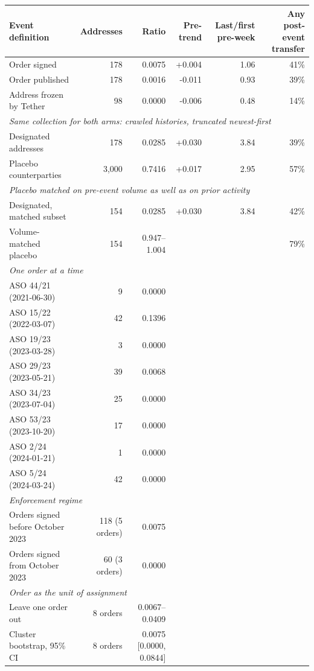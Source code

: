 \begin{tabular}{lrrrrr}
\toprule
Event definition & Addresses & Ratio & Pre-trend & Last/first pre-week & Any post-event transfer \\
\midrule
Order signed & 178 & 0.0075 & +0.004 & 1.06 & 41\% \\
Order published & 178 & 0.0016 & -0.011 & 0.93 & 39\% \\
Address frozen by Tether & 98 & 0.0000 & -0.006 & 0.48 & 14\% \\
\midrule
\multicolumn{6}{l}{\emph{Same collection for both arms: crawled histories, truncated newest-first}} \\
\quad Designated addresses & 178 & 0.0285 & +0.030 & 3.84 & 39\% \\
\quad Placebo counterparties & 3,000 & 0.7416 & +0.017 & 2.95 & 57\% \\
\midrule
\multicolumn{6}{l}{\emph{Placebo matched on pre-event volume as well as on prior activity}} \\
\quad Designated, matched subset & 154 & 0.0285 & +0.030 & 3.84 & 42\% \\
\quad Volume-matched placebo & 154 & 0.947--1.004 & & & 79\% \\
\midrule
\multicolumn{6}{l}{\emph{One order at a time}} \\
\quad ASO 44/21 (2021-06-30) & 9 & 0.0000 & & & \\
\quad ASO 15/22 (2022-03-07) & 42 & 0.1396 & & & \\
\quad ASO 19/23 (2023-03-28) & 3 & 0.0000 & & & \\
\quad ASO 29/23 (2023-05-21) & 39 & 0.0068 & & & \\
\quad ASO 34/23 (2023-07-04) & 25 & 0.0000 & & & \\
\quad ASO 53/23 (2023-10-20) & 17 & 0.0000 & & & \\
\quad ASO 2/24 (2024-01-21) & 1 & 0.0000 & & & \\
\quad ASO 5/24 (2024-03-24) & 42 & 0.0000 & & & \\
\midrule
\multicolumn{6}{l}{\emph{Enforcement regime}} \\
\quad Orders signed before October 2023 & 118 (5 orders) & 0.0075 & & & \\
\quad Orders signed from October 2023 & 60 (3 orders) & 0.0000 & & & \\
\midrule
\multicolumn{6}{l}{\emph{Order as the unit of assignment}} \\
\quad Leave one order out & 8 orders & 0.0067--0.0409 & & & \\
\quad Cluster bootstrap, 95\% CI & 8 orders & 0.0075 [0.0000, 0.0844] & & & \\
\bottomrule
\end{tabular}
